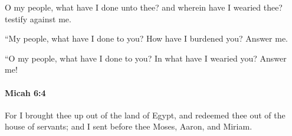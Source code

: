 			\begin{versebox}
					\item[BHS] 
					\item[LXX] 
					\item[ASV] O my people, what have I done unto thee? and wherein have I wearied thee? testify against me.
					\item[NIV] “My people, what have I done to you? How have I burdened you? Answer me.
					\item[NRSV] “O my people, what have I done to you? In what have I wearied you? Answer me!
			\end{versebox}

		\paragraph{Micah 6:4} %
			\label{MICAH-6-4}

			For I brought thee up out of the land of Egypt, and redeemed thee out of the house of servants; and I sent before thee Moses, Aaron, and Miriam.


